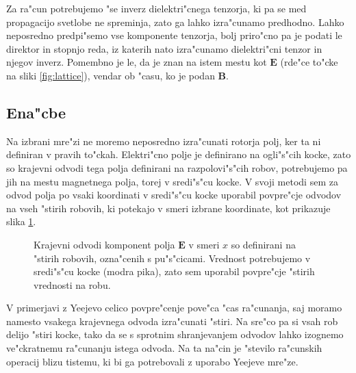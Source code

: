 \documentclass[a4paper,10pt]{article}
\renewcommand{\vec}{\mathbf}
\newcommand{\E}{\vec E}
\newcommand{\B}{\vec B}
\begin{document}
Za ra"cun potrebujemo "se inverz dielektri"cnega tenzorja, ki pa se med propagacijo svetlobe ne spreminja, zato ga lahko izra"cunamo predhodno. 
Lahko neposredno predpi"semo vse komponente tenzorja, bolj priro"cno pa je podati le direktor in stopnjo reda, iz katerih nato izra"cunamo dielektri"cni tenzor in njegov inverz. 
Pomembno je le, da je znan na istem mestu kot $\E$ (rde"ce to"cke na sliki \ref{fig:lattice}), vendar ob "casu, ko je podan $\B$. 

\subsection{Ena"cbe}

Na izbrani mre"zi ne moremo neposredno izra"cunati rotorja polj, ker ta ni definiran v pravih to"ckah. 
Elektri"cno polje je definirano na ogli"s"cih kocke, zato so krajevni odvodi tega polja definirani na razpolovi"s"cih robov, potrebujemo pa jih na mestu magnetnega polja, torej v sredi"s"cu kocke. 
V svoji metodi sem za odvod polja po vsaki koordinati v sredi"s"cu kocke uporabil povpre"cje odvodov na vseh "stirih robovih, ki potekajo v smeri izbrane koordinate, kot prikazuje slika \ref{fig:lattice-derivatives}. 

\begin{figure}[h]
\centering
 \caption{
 Krajevni odvodi komponent polja $\E$ v smeri $x$ so definirani na "stirih robovih, ozna"cenih s pu"s"cicami. 
 Vrednost potrebujemo v sredi"s"cu kocke (modra pika), zato sem uporabil povpre"cje "stirih vrednosti na robu. 
 }
 \label{fig:lattice-derivatives}
\end{figure}

V primerjavi z Yeejevo celico povpre"cenje pove"ca "cas ra"cunanja, saj moramo namesto vsakega krajevnega odvoda izra"cunati "stiri. 
Na sre"co pa si vsah rob delijo "stiri kocke, tako da se s sprotnim shranjevanjem odvodov lahko izognemo ve"ckratnemu ra"cunanju istega odvoda. 
Na ta na"cin je "stevilo ra"cunskih operacij blizu tistemu, ki bi ga potrebovali z uporabo Yeejeve mre"ze. 
\end{document}

